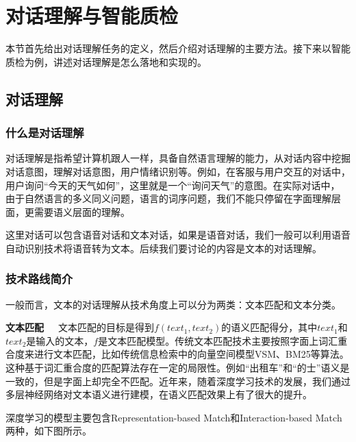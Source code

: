 %
%
%
\chapter{对话理解与智能质检}
\label{basic} %
本节首先给出对话理解任务的定义，然后介绍对话理解的主要方法。接下来以智能质检为例，讲述对话理解是怎么落地和实现的。
\section{对话理解}
\subsection{什么是对话理解}
对话理解是指希望计算机跟人一样，具备自然语言理解的能力，从对话内容中挖掘对话意图，理解对话意图，用户情绪识别等。例如，在客服与用户交互的对话中，用户询问“今天的天气如何”，这里就是一个“询问天气”的意图。在实际对话中，
由于自然语言的多义同义问题，语言的词序问题，我们不能只停留在字面理解层面，更需要语义层面的理解。

这里对话可以包含语音对话和文本对话，如果是语音对话，我们一般可以利用语音自动识别技术将语音转为文本。后续我们要讨论的内容是文本的对话理解。
\subsection{技术路线简介}
一般而言，文本的对话理解从技术角度上可以分为两类：文本匹配和文本分类。

\textbf{文本匹配}~~~文本匹配的目标是得到$f(text_1, text_2)$的语义匹配得分，其中$text_1$和$text_2$是输入的文本，$f$是文本匹配模型。传统文本匹配技术主要按照字面上词汇重合度来进行文本匹配，比如传统信息检索中的向量空间模型VSM、BM25等算法。这种基于词汇重合度的匹配算法存在一定的局限性。例如“出租车”和“的士”语义是一致的，但是字面上却完全不匹配。近年来，随着深度学习技术的发展，我们通过多层神经网络对文本语义进行建模，在语义匹配效果上有了很大的提升。

深度学习的模型主要包含Representation-based Match和Interaction-based Match两种，如下图所示。

